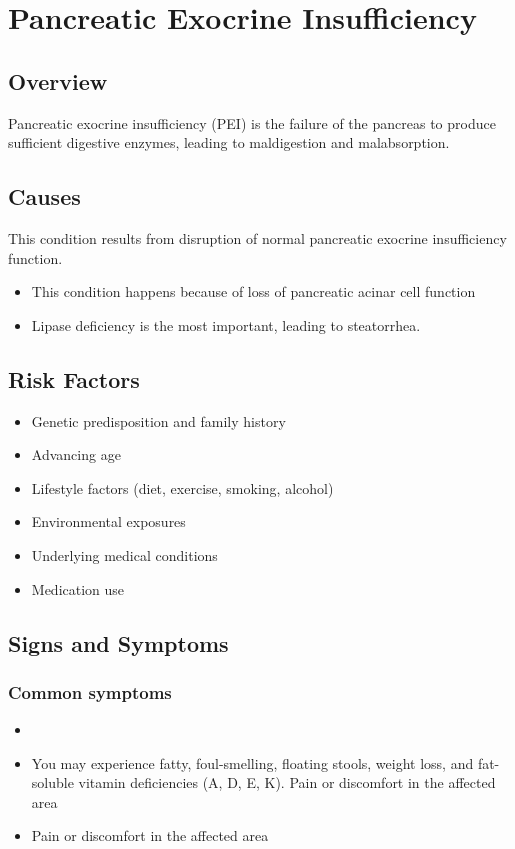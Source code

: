 \chapter{Pancreatic Exocrine Insufficiency}
\label{sec:Pancreatic Exocrine Insufficiency}

\section{Overview}
Pancreatic exocrine insufficiency (PEI) is the failure of the pancreas to produce sufficient digestive enzymes, leading to maldigestion and malabsorption.
\section{Causes}
This condition results from disruption of normal pancreatic exocrine insufficiency function.

\begin{itemize}[noitemsep]
  \item This condition happens because of loss of pancreatic acinar cell function
  \item Lipase deficiency is the most important, leading to steatorrhea.
\end{itemize}
\section{Risk Factors}


\begin{itemize}[noitemsep]
  \item Genetic predisposition and family history
  \item Advancing age
  \item Lifestyle factors (diet, exercise, smoking, alcohol)
  \item Environmental exposures
  \item Underlying medical conditions
  \item Medication use
\end{itemize}
\section{Signs and Symptoms}

\subsection{Common symptoms}
\begin{itemize}[noitemsep]
  \item \item You may experience fatty, foul-smelling, floating stools, weight loss, and fat-soluble vitamin deficiencies (A, D, E, K). Pain or discomfort in the affected area    \item Pain or discomfort in the affected area
  \end{itemize}

